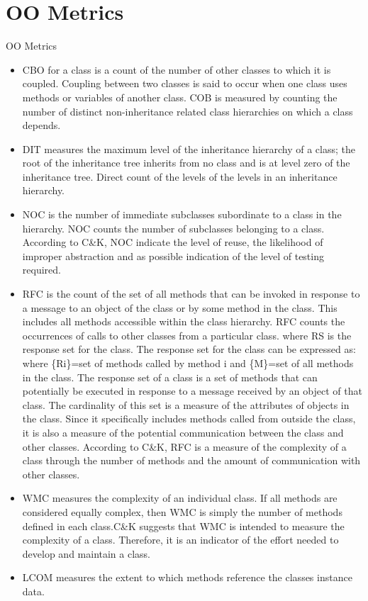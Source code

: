 \documentclass[]{book}
\theoremstyle{definition}
\theoremstyle{definition}
\theoremstyle{remark}
\begin{document}
{\section{OO Metrics}\label{oo-metrics}

OO Metrics

\citep{Chidamber1994}

\begin{itemize}
\item
  CBO for a class is a count of the number of other classes to which it
  is coupled. Coupling between two classes is said to occur when one
  class uses methods or variables of another class. COB is measured by
  counting the number of distinct non-inheritance related class
  hierarchies on which a class depends.
\item
  DIT measures the maximum level of the inheritance hierarchy of a
  class; the root of the inheritance tree inherits from no class and is
  at level zero of the inheritance tree. Direct count of the levels of
  the levels in an inheritance hierarchy.
\item
  NOC is the number of immediate subclasses subordinate to a class in
  the hierarchy. NOC counts the number of subclasses belonging to a
  class. According to C\&K, NOC indicate the level of reuse, the
  likelihood of improper abstraction and as possible indication of the
  level of testing required.
\item
  RFC is the count of the set of all methods that can be invoked in
  response to a message to an object of the class or by some method in
  the class. This includes all methods accessible within the class
  hierarchy. RFC counts the occurrences of calls to other classes from a
  particular class. where RS is the response set for the class. The
  response set for the class can be expressed as: where \{Ri\}=set of
  methods called by method i and \{M\}=set of all methods in the class.
  The response set of a class is a set of methods that can potentially
  be executed in response to a message received by an object of that
  class. The cardinality of this set is a measure of the attributes of
  objects in the class. Since it specifically includes methods called
  from outside the class, it is also a measure of the potential
  communication between the class and other classes. According to C\&K,
  RFC is a measure of the complexity of a class through the number of
  methods and the amount of communication with other classes.
\item
  WMC measures the complexity of an individual class. If all methods are
  considered equally complex, then WMC is simply the number of methods
  defined in each class.C\&K suggests that WMC is intended to measure
  the complexity of a class. Therefore, it is an indicator of the effort
  needed to develop and maintain a class.
\item
  LCOM measures the extent to which methods reference the classes
  instance data.
\end{itemize}

}
\end{document}
